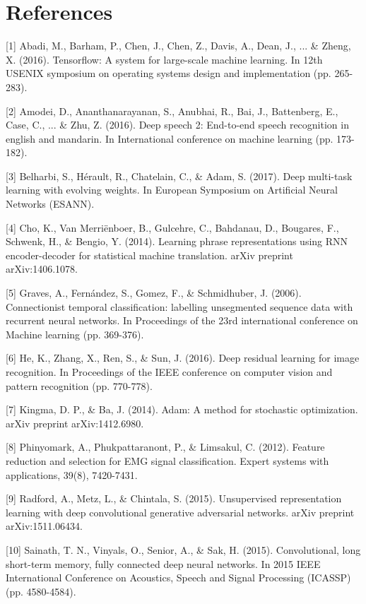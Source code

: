 \section*{References}

{
\small

[1] Abadi, M., Barham, P., Chen, J., Chen, Z., Davis, A., Dean, J., ... \& Zheng, X. (2016). Tensorflow: A system for large-scale machine learning. In 12th USENIX symposium on operating systems design and implementation (pp. 265-283).

[2] Amodei, D., Ananthanarayanan, S., Anubhai, R., Bai, J., Battenberg, E., Case, C., ... \& Zhu, Z. (2016). Deep speech 2: End-to-end speech recognition in english and mandarin. In International conference on machine learning (pp. 173-182).

[3] Belharbi, S., Hérault, R., Chatelain, C., \& Adam, S. (2017). Deep multi-task learning with evolving weights. In European Symposium on Artificial Neural Networks (ESANN).

[4] Cho, K., Van Merriënboer, B., Gulcehre, C., Bahdanau, D., Bougares, F., Schwenk, H., \& Bengio, Y. (2014). Learning phrase representations using RNN encoder-decoder for statistical machine translation. arXiv preprint arXiv:1406.1078.

[5] Graves, A., Fernández, S., Gomez, F., \& Schmidhuber, J. (2006). Connectionist temporal classification: labelling unsegmented sequence data with recurrent neural networks. In Proceedings of the 23rd international conference on Machine learning (pp. 369-376).

[6] He, K., Zhang, X., Ren, S., \& Sun, J. (2016). Deep residual learning for image recognition. In Proceedings of the IEEE conference on computer vision and pattern recognition (pp. 770-778).

[7] Kingma, D. P., \& Ba, J. (2014). Adam: A method for stochastic optimization. arXiv preprint arXiv:1412.6980.

[8] Phinyomark, A., Phukpattaranont, P., \& Limsakul, C. (2012). Feature reduction and selection for EMG signal classification. Expert systems with applications, 39(8), 7420-7431.

[9] Radford, A., Metz, L., \& Chintala, S. (2015). Unsupervised representation learning with deep convolutional generative adversarial networks. arXiv preprint arXiv:1511.06434.

[10] Sainath, T. N., Vinyals, O., Senior, A., \& Sak, H. (2015). Convolutional, long short-term memory, fully connected deep neural networks. In 2015 IEEE International Conference on Acoustics, Speech and Signal Processing (ICASSP) (pp. 4580-4584).

}
